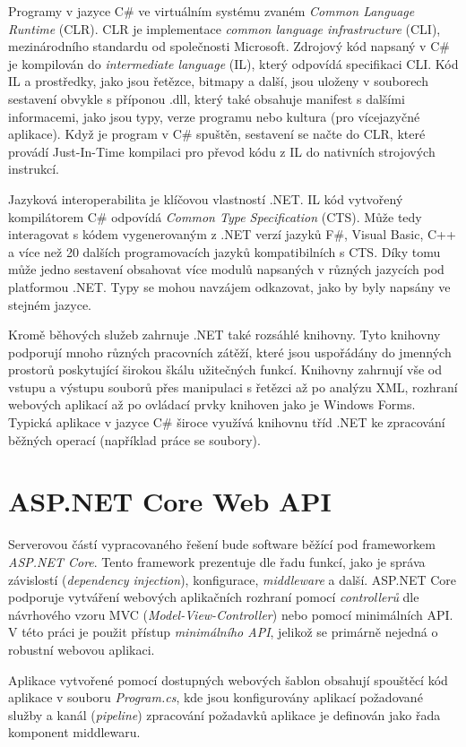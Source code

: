 Programy v jazyce C\# ve virtuálním systému zvaném {\it Common Language Runtime} (CLR). CLR je implementace {\it common language infrastructure} (CLI), mezinárodního standardu od společnosti Microsoft. Zdrojový kód napsaný v C\# je kompilován do {\it intermediate language} (IL), který odpovídá specifikaci CLI. Kód IL a prostředky, jako jsou řetězce, bitmapy a další, jsou uloženy v souborech sestavení obvykle s příponou .dll, který také obsahuje manifest s dalšími informacemi, jako jsou typy, verze programu nebo kultura (pro vícejazyčné aplikace). Když je program v C\# spuštěn, sestavení se načte do CLR, které provádí Just-In-Time kompilaci pro převod kódu z IL do nativních strojových instrukcí.

Jazyková interoperabilita je klíčovou vlastností .NET. IL kód vytvořený kompilátorem C\# odpovídá {\it Common Type Specification} (CTS). Může tedy interagovat s kódem vygenerovaným z .NET verzí jazyků F\#, Visual Basic, C++ a více než 20 dalších programovacích jazyků kompatibilních s CTS. Díky tomu může jedno sestavení obsahovat více modulů napsaných v různých jazycích pod platformou .NET. Typy se mohou navzájem odkazovat, jako by byly napsány ve stejném jazyce.

Kromě běhových služeb zahrnuje .NET také rozsáhlé knihovny. Tyto knihovny podporují mnoho různých pracovních zátěží, které jsou uspořádány do jmenných prostorů poskytující širokou škálu užitečných funkcí. Knihovny zahrnují vše od vstupu a výstupu souborů přes manipulaci s řetězci až po analýzu XML, rozhraní webových aplikací až po ovládací prvky knihoven jako je Windows Forms. Typická aplikace v jazyce C\# široce využívá knihovnu tříd .NET ke zpracování běžných operací (například práce se soubory).


\section{ASP.NET Core Web API}
Serverovou částí vypracovaného řešení bude software běžící pod frameworkem {\it ASP.NET Core}. Tento framework prezentuje dle \cite{about_asp} řadu funkcí, jako je správa závislostí ({\it dependency injection}), konfigurace, {\it middleware} a další. ASP.NET Core podporuje vytváření webových aplikačních rozhraní pomocí {\it controllerů} \cite{asp_controllers} dle návrhového vzoru MVC ({\it Model-View-Controller}) nebo pomocí minimálních API. V této práci je použit přístup {\it minimálního API}, jelikož se primárně nejedná o robustní webovou aplikaci.

Aplikace vytvořené pomocí dostupných webových šablon obsahují spouštěcí kód aplikace v souboru {\it Program.cs}, kde jsou konfigurovány aplikací požadované služby a kanál ({\it pipeline}) zpracování požadavků aplikace je definován jako řada komponent middlewaru.

